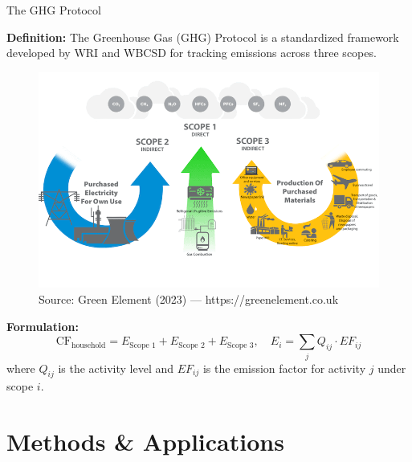 \documentclass{beamer}
\begin{document}
\begin{frame}{The GHG Protocol}
\small
\vspace{-2.5em}

\footnotesize \textbf{Definition:}  
The Greenhouse Gas (GHG) Protocol is a standardized framework developed by WRI and WBCSD for tracking emissions across three scopes.
\vspace{-0.5em}
\pause
\begin{figure}[h]
  \centering
  \includegraphics[width=0.55\linewidth]{ghg scope.png}
  \caption*{\tiny Source: Green Element (2023) — https://greenelement.co.uk}
\end{figure}
\vspace{-1.0em}
\pause
\footnotesize \textbf{Formulation:}
\[
\text{CF}_{\text{household}} = E_{\text{Scope 1}} + E_{\text{Scope 2}} + E_{\text{Scope 3}}, \quad 
E_i = \sum_j Q_{ij} \cdot EF_{ij}
\]
{\footnotesize where $Q_{ij}$ is the activity level and $EF_{ij}$ is the emission factor for activity $j$ under scope $i$.}

\end{frame}

\section{Methods \& Applications}
\end{document}
